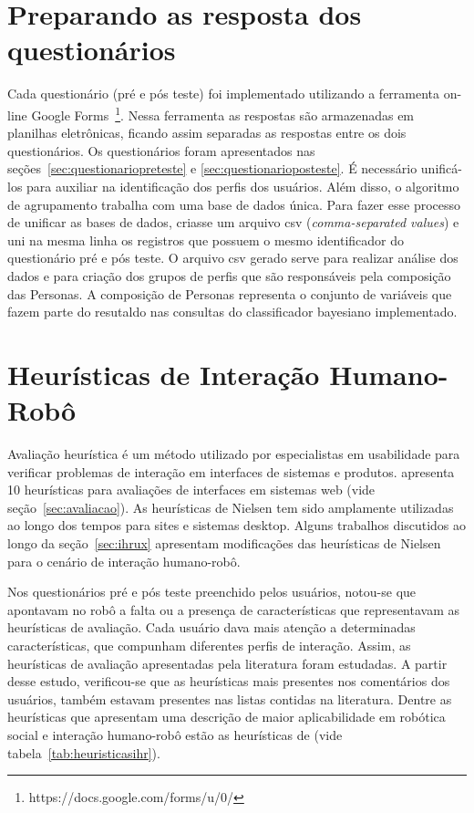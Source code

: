 \section{Preparando as resposta dos questionários}
\label{sec:respostasbd}
Cada questionário (pré e pós teste) foi implementado utilizando a ferramenta on-line Google Forms~\footnote{https://docs.google.com/forms/u/0/}. Nessa ferramenta as respostas são armazenadas em planilhas eletrônicas, ficando assim separadas as respostas entre os dois questionários. Os questionários foram apresentados nas seções~\ref{sec:questionariopreteste} e \ref{sec:questionarioposteste}. É necessário unificá-los para auxiliar na identificação dos perfis dos usuários. Além disso, o algoritmo de agrupamento trabalha com uma base de dados única. Para fazer esse processo de unificar as bases de dados, criasse um arquivo csv (\emph{comma-separated values}) e uni na mesma linha os registros que possuem o mesmo identificador do questionário pré e pós teste. O arquivo csv gerado serve para realizar análise dos dados e para criação dos grupos de perfis que são responsáveis pela composição das Personas. A composição de Personas representa o conjunto de variáveis que fazem parte do resutaldo nas consultas do classificador bayesiano implementado.

\section{Heurísticas de Interação Humano-Robô}
\label{sec:heuristicas}
Avaliação heurística é um método utilizado por especialistas em usabilidade para verificar problemas de interação em interfaces de sistemas e produtos.  apresenta 10 heurísticas para avaliações de interfaces em sistemas web (vide seção~\ref{sec:avaliacao}). As heurísticas de Nielsen tem sido amplamente utilizadas ao longo dos tempos para sites e sistemas desktop. Alguns trabalhos discutidos ao longo da seção~\ref{sec:ihrux} apresentam modificações das heurísticas de Nielsen para o cenário de interação humano-robô.

Nos questionários pré e pós teste preenchido pelos usuários, notou-se que apontavam no robô a falta ou a presença de características que representavam as heurísticas de avaliação. Cada usuário dava mais atenção a determinadas características, que compunham diferentes perfis de interação. Assim, as heurísticas de avaliação apresentadas pela literatura foram estudadas. A partir desse estudo, verificou-se que as heurísticas mais presentes nos comentários dos usuários, também estavam presentes nas listas contidas na literatura. Dentre as heurísticas que apresentam uma descrição de maior aplicabilidade em robótica social e interação humano-robô estão as heurísticas de  (vide tabela~\ref{tab:heuristicasihr}).

